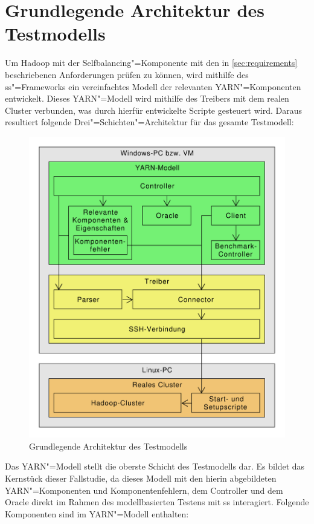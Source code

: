 \section{Grundlegende Architektur des Testmodells}
\label{sec:modelArchitecture}

Um Hadoop mit der Selfbalancing"=Komponente mit den in \cref{sec:requirements} beschriebenen Anforderungen prüfen zu können, wird mithilfe des \gls{ss}"=Frameworks ein vereinfachtes Modell der relevanten \gls{YARN}"=Komponenten entwickelt.
Dieses \gls{YARN}"=Modell wird mithilfe des Treibers mit dem realen Cluster verbunden, was durch hierfür entwickelte Scripte gesteuert wird.
Daraus resultiert folgende Drei"=Schichten"=Architektur für das gesamte Testmodell:

\begin{figure}[h]
    \includegraphics[width=0.6\columnwidth]{./resources/modelArchitecture.pdf}
    \caption{Grundlegende Architektur des Testmodells}
    \label{fig:modelArchitecture}
\end{figure}

Das \gls{YARN}"=Modell stellt die oberste Schicht des Testmodells dar.
Es bildet das Kernstück dieser Fallstudie, da dieses Modell mit den hierin abgebildeten \gls{YARN}"=Komponenten und Komponentenfehlern, dem Controller und dem Oracle direkt im Rahmen des modellbasierten Testens mit \gls{ss} interagiert.
Folgende Komponenten sind im \gls{YARN}"=Modell enthalten:

